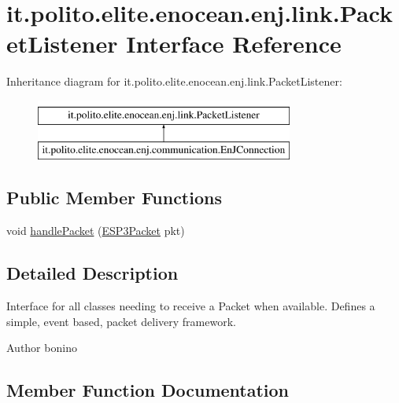 \hypertarget{interfaceit_1_1polito_1_1elite_1_1enocean_1_1enj_1_1link_1_1_packet_listener}{}\section{it.\+polito.\+elite.\+enocean.\+enj.\+link.\+Packet\+Listener Interface Reference}
\label{interfaceit_1_1polito_1_1elite_1_1enocean_1_1enj_1_1link_1_1_packet_listener}
Inheritance diagram for it.\+polito.\+elite.\+enocean.\+enj.\+link.\+Packet\+Listener\+:\begin{figure}[H]
\begin{center}
\leavevmode
\includegraphics[height=2.000000cm]{interfaceit_1_1polito_1_1elite_1_1enocean_1_1enj_1_1link_1_1_packet_listener}
\end{center}
\end{figure}
\subsection*{Public Member Functions}
\begin{DoxyCompactItemize}
\item 
void \hyperlink{interfaceit_1_1polito_1_1elite_1_1enocean_1_1enj_1_1link_1_1_packet_listener_a30b8942feaad919c75fc4cdf4d76dea6}{handle\+Packet} (\hyperlink{classit_1_1polito_1_1elite_1_1enocean_1_1protocol_1_1serial_1_1v3_1_1network_1_1packet_1_1_e_s_p3_packet}{E\+S\+P3\+Packet} pkt)
\end{DoxyCompactItemize}


\subsection{Detailed Description}
Interface for all classes needing to receive a Packet when available. Defines a simple, event based, packet delivery framework.

\begin{DoxyAuthor}{Author}
bonino 
\end{DoxyAuthor}


\subsection{Member Function Documentation}
\hypertarget{interfaceit_1_1polito_1_1elite_1_1enocean_1_1enj_1_1link_1_1_packet_listener_a30b8942feaad919c75fc4cdf4d76dea6}{}\label{interfaceit_1_1polito_1_1elite_1_1enocean_1_1enj_1_1link_1_1_packet_listener_a30b8942feaad919c75fc4cdf4d76dea6} 
